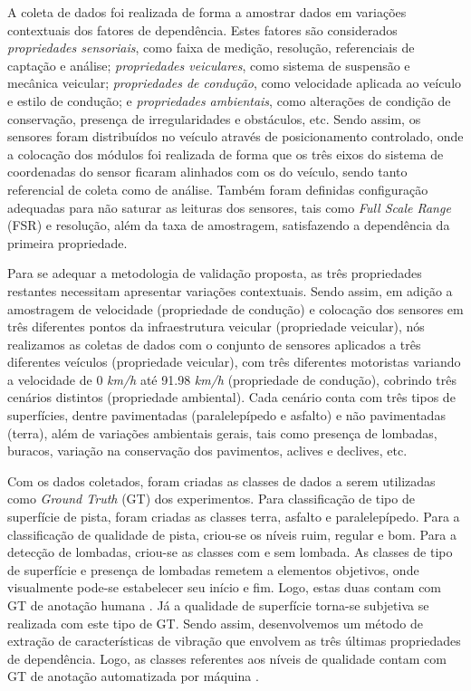 A coleta de dados foi realizada de forma a amostrar dados em variações contextuais dos fatores de dependência. Estes fatores são considerados \emph{propriedades sensoriais}, como faixa de medição, resolução, referenciais de captação e análise; \emph{propriedades veiculares}, como sistema de suspensão e mecânica veicular; \emph{propriedades de condução}, como velocidade aplicada ao veículo e estilo de condução; e \emph{propriedades ambientais}, como alterações de condição de conservação, presença de irregularidades e obstáculos, etc. Sendo assim, os sensores foram distribuídos no veículo através de posicionamento controlado, onde a colocação dos módulos foi realizada de forma que os três eixos do sistema de coordenadas do sensor ficaram alinhados com os do veículo, sendo tanto referencial de coleta como de análise. Também foram definidas configuração adequadas para não saturar as leituras dos sensores, tais como \textit{Full Scale Range} (FSR) e resolução, além da taxa de amostragem, satisfazendo a dependência da primeira propriedade.

Para se adequar a metodologia de validação proposta, as três propriedades restantes necessitam apresentar variações contextuais. Sendo assim, em adição a amostragem de velocidade (propriedade de condução) e colocação dos sensores em três diferentes pontos da infraestrutura veicular (propriedade veicular), nós realizamos as coletas de dados com o conjunto de sensores aplicados a três diferentes veículos (propriedade veicular), com três diferentes motoristas variando a velocidade de 0 \emph{km/h} até 91.98 \emph{km/h} (propriedade de condução), cobrindo três cenários distintos (propriedade ambiental). Cada cenário conta com três tipos de superfícies, dentre pavimentadas (paralelepípedo e asfalto) e não pavimentadas (terra), além de variações ambientais gerais, tais como presença de lombadas, buracos, variação na conservação dos pavimentos, aclives e declives, etc.

Com os dados coletados, foram criadas as classes de dados a serem utilizadas como \textit{Ground Truth} (GT) dos experimentos. Para classificação de tipo de superfície de pista, foram criadas as classes terra, asfalto e paralelepípedo. Para a classificação de qualidade de pista, criou-se os níveis ruim, regular e bom. Para a detecção de lombadas, criou-se as classes com e sem lombada. As classes de tipo de superfície e presença de lombadas remetem a elementos objetivos, onde visualmente pode-se estabelecer seu início e fim. Logo, estas duas contam com GT de anotação humana \cite{Krig2014}. Já a qualidade de superfície torna-se subjetiva se realizada com este tipo de GT. Sendo assim, desenvolvemos um método de extração de características de vibração que envolvem as três últimas propriedades de dependência. Logo, as classes referentes aos níveis de qualidade contam com GT de anotação automatizada por máquina \cite{Krig2014}.

